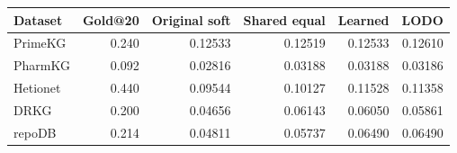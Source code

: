 \begin{tabular}{lrrrrr}
\toprule
Dataset & Gold@20 & Original soft & Shared equal & Learned & LODO \\
\midrule
PrimeKG & 0.240 & 0.12533 & 0.12519 & 0.12533 & 0.12610 \\
PharmKG & 0.092 & 0.02816 & 0.03188 & 0.03188 & 0.03186 \\
Hetionet & 0.440 & 0.09544 & 0.10127 & 0.11528 & 0.11358 \\
DRKG & 0.200 & 0.04656 & 0.06143 & 0.06050 & 0.05861 \\
repoDB & 0.214 & 0.04811 & 0.05737 & 0.06490 & 0.06490 \\
\bottomrule
\end{tabular}
